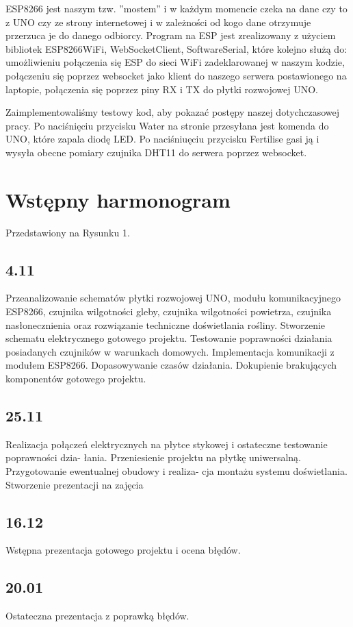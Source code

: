 \documentclass[12pt]{article}
\begin{document}
ESP8266 jest naszym tzw. ''mostem'' i w każdym momencie czeka na dane czy to z UNO czy ze strony internetowej i w zależności od kogo dane otrzymuje przerzuca je do danego odbiorcy.
Program na ESP jest zrealizowany z użyciem bibliotek ESP8266WiFi, WebSocketClient, SoftwareSerial, które kolejno służą do: umożliwieniu połączenia się ESP do sieci WiFi zadeklarowanej w naszym kodzie, połączeniu się poprzez websocket jako klient do naszego serwera postawionego na laptopie, połączenia się poprzez piny RX i TX do płytki rozwojowej UNO.

Zaimplementowaliśmy testowy kod, aby pokazać postępy naszej dotychczasowej pracy. Po naciśnięciu przycisku Water na stronie przesyłana jest komenda do UNO, które zapala diodę LED. Po naciśniuęciu przycisku Fertilise gasi ją i wysyła obecne pomiary czujnika DHT11 do serwera poprzez websocket.



\section{Wstępny harmonogram}
Przedstawiony na Rysunku 1.
\subsection{4.11}
Przeanalizowanie schematów płytki rozwojowej UNO, modułu komunikacyjnego ESP8266, czujnika wilgotności gleby, czujnika wilgotności powietrza, czujnika nasłonecznienia oraz rozwiązanie techniczne doświetlania rośliny. Stworzenie schematu elektrycznego gotowego projektu. Testowanie poprawności działania posiadanych czujników w warunkach domowych. Implementacja komunikacji z modułem ESP8266. Dopasowywanie czasów działania. 
Dokupienie brakujących komponentów gotowego projektu. 
\subsection{25.11}
Realizacja połączeń elektrycznych na płytce stykowej i ostateczne testowanie poprawności dzia-
łania. Przeniesienie projektu na płytkę uniwersalną. Przygotowanie ewentualnej obudowy i realiza-
cja montażu systemu doświetlania. Stworzenie prezentacji na zajęcia

\subsection{16.12}
Wstępna prezentacja gotowego projektu i ocena błędów.

\subsection{20.01}
Ostateczna prezentacja z poprawką błędów.
\end{document}
